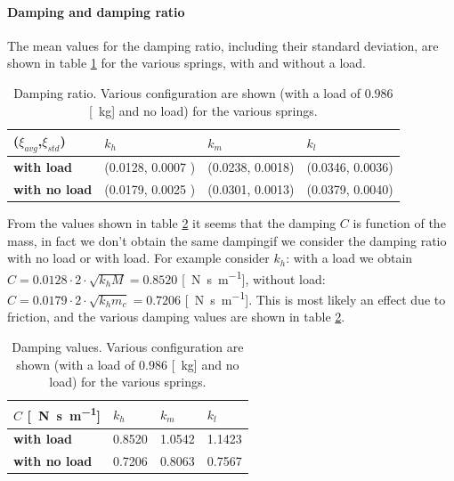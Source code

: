 \paragraph{Damping and damping ratio}
The mean values for the damping ratio, including their standard deviation, are shown in table \ref{table: cart_detached_dampingratio} for the various springs, with and without a load.
\begin{table}[!h]
\centering

\label{table: cart_detached_dampingratio}
\begin{tabular}{|l|l|l|l|}
\hline
{(\textbf{$\xi_{avg}$},$\xi_{std}$)} & \textbf{$k_h$} & \textbf{$k_m$}   & \textbf{$k_l$}   \\ \hline
\textbf{with load}         & (0.0128,  0.0007 )    & (0.0238, 0.0018) & (0.0346, 0.0036) \\ \hline
\textbf{with no load}      & (0.0179, 0.0025 )    & (0.0301, 0.0013) & (0.0379, 0.0040)      \\ \hline
\end{tabular}
\caption{Damping ratio. Various configuration are shown (with a load of $0.986$ [\SI{}{\kilo \gram}] and no load) for the various springs. }
\end{table}


From the values shown in table \ref{table: cart_detached_damping} it seems that the damping $C$ is function of the mass, in fact we don't obtain the same dampingif we consider the damping ratio with no load or with load. For example consider $k_h$: with a load we obtain $C= 0.0128\cdot2\cdot\sqrt{k_h M}=0.8520$ [\SI{}{\newton \second \per \metre}], without load: $C=0.0179\cdot2\cdot\sqrt{k_h m_c}=0.7206$ [\SI{}{\newton \second \per \metre}]. This is most likely an effect due to friction, and the various damping values are shown in table 
\ref{table: cart_detached_damping}.
\begin{table}[!h]
\centering
\label{table: cart_detached_damping}
\begin{tabular}{|l|l|l|l|}
\hline
{$C$ [\SI{}{\newton \second \per \metre}]} & \textbf{$k_h$} & \textbf{$k_m$}   & \textbf{$k_l$}   \\ \hline
\textbf{with load}         &0.8520    & 1.0542 & 1.1423 \\ \hline
\textbf{with no load}     &0.7206    & 0.8063 & 0.7567      \\ \hline
\end{tabular}
\caption{Damping values. Various configuration are shown (with a load of $0.986$ [\SI{}{\kilo \gram}] and no load) for the various springs. }
\end{table}

